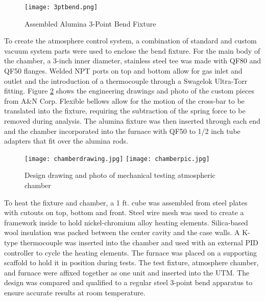         \begin{figure}
            \texttt{[image: 3ptbend.png]}
            \caption{Assembled Alumina 3-Point Bend Fixture}
            \label{fig:3ptbend}
        \end{figure}

        To create the atmosphere control system, a combination of standard and custom vacuum system parts were used to enclose the bend fixture.
        For the main body of the chamber, a 3-inch inner diameter, stainless steel tee was made with QF80 and QF50 flanges.
        Welded NPT ports on top and bottom allow for gas inlet and outlet and the introduction of a thermocouple through a Swagelok Ultra-Torr fitting.
        Figure \ref{fig:chamber} shows the engineering drawings and photo of the custom pieces from A\&N Corp.
        Flexible bellows allow for the motion of the cross-bar to be translated into the fixture, requiring the subtraction of the spring force to be removed during analysis.
        The alumina fixture was then inserted through each end and the chamber incorporated into the furnace with QF50 to 1/2 inch tube adapters that fit over the alumina rods.

        \begin{figure}
            \texttt{[image: chamberdrawing.jpg]}
            \texttt{[image: chamberpic.jpg]}
            \caption{Design drawing and photo of mechanical testing atmospheric chamber}
            \label{fig:chamber}
        \end{figure}

        To heat the fixture and chamber, a 1 ft. cube was assembled from steel plates with cutouts on top, bottom and front.
        Steel wire mesh was used to create a framework inside to hold nickel-chromium alloy heating elements.
        Silica-based wool insulation was packed between the center cavity and the case walls.
        A K-type thermocouple was inserted into the chamber and used with an external PID controller to cycle the heating elements.
        The furnace was placed on a supporting scaffold to hold it in position during tests.
        The test fixture, atmosphere chamber, and furnace were affixed together as one unit and inserted into the UTM.
        The design was compared and qualified to a regular steel 3-point bend apparatus to ensure accurate results at room temperature.


